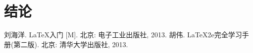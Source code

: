 \documentclass{cjc}
\begin{document}



% 
% 



\section{结论}














\begin{thebibliography}{1}
   刘海洋. \LaTeX 入门 [M]. 北京: 电子工业出版社, 2013.
    胡伟. \LaTeX 2e完全学习手册(第二版). 北京: 清华大学出版社, 2013.
  \end{thebibliography}
\end{document}
